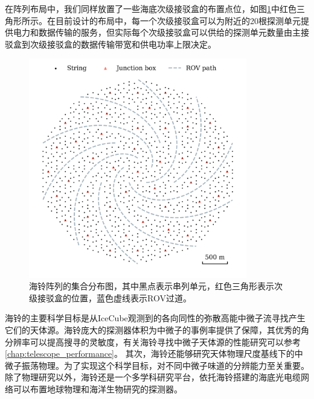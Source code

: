 在阵列布局中，我们同样放置了一些海底次级接驳盒的布置点位，如图\ref{fig:geo-layout}中红色三角形所示。在目前设计的布局中，每一个次级接驳盒可以为附近的20根探测单元提供电力和数据传输的服务，但实际每个次级接驳盒可以供给的探测单元数量由主接驳盒到次级接驳盒的数据传输带宽和供电功率上限决定。

\begin{figure}[!htb]%
    \centering
    \includegraphics[width=0.85\textwidth]{img/penrose_tiling.png}
    \caption{海铃阵列的集合分布图，其中黑点表示串列单元，红色三角形表示次级接驳盒的位置，蓝色虚线表示ROV过道。}
    \label{fig:geo-layout}
\end{figure}

海铃的主要科学目标是从IceCube观测到的各向同性的弥散高能中微子流寻找产生它们的天体源。海铃庞大的探测器体积为中微子的事例率提供了保障，其优秀的角分辨率可以提高搜寻的灵敏度，有关海铃寻找中微子天体源的性能研究可以参考\ref{chap:telescope_performance}。
其次，海铃还能够研究天体物理尺度基线下的中微子振荡物理。为了实现这个科学目标，对不同中微子味道的分辨能力至关重要。
除了物理研究以外，海铃还是一个多学科研究平台，依托海铃搭建的海底光电缆网络可以布置地球物理和海洋生物研究的探测器。

